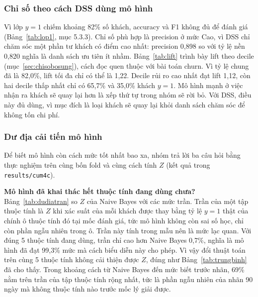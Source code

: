 \begin{table}[!htbp]
\centering
\caption{Giá trị ròng $Z$ của bốn cách chọn khách ở bốn mốc đánh giá}
\label{tab:zrecency}
\footnotesize
\resizebox{\textwidth}{!}{}
\end{table}

\subsubsection{Chỉ số theo cách DSS dùng mô hình}
Vì lớp $y=1$ chiếm khoảng 82\% số khách, accuracy và F1 không đủ để đánh giá (Bảng~\ref{tab:lop1}, mục 5.3.3). Chỉ số phù hợp là precision ở mức Cao, vì DSS chỉ chăm sóc một phần tư khách có điểm cao nhất: precision 0,898 so với tỷ lệ nền 0,820 nghĩa là danh sách ưu tiên ít nhầm. Bảng~\ref{tab:lift} trình bày lift theo decile (mục~\ref{sec:chisobosung}), cách đọc quen thuộc với bài toán churn. Vì tỷ lệ chung đã là 82,0\%, lift tối đa chỉ có thể là 1,22. Decile rủi ro cao nhất đạt lift 1,12, còn hai decile thấp nhất chỉ có 65,7\% và 35,0\% khách $y=1$. Mô hình mạnh ở việc nhận ra khách sẽ quay lại hơn là xếp thứ tự trong nhóm sẽ rời bỏ. Với DSS, điều này đủ dùng, vì mục đích là loại khách sẽ quay lại khỏi danh sách chăm sóc để không tốn chi phí.

\begin{table}[!htbp]
\centering
\caption{Lift theo decile của Naive Bayes tại mốc 01/03/2014 (tỷ lệ $y=1$ chung 82,0\%)}
\label{tab:lift}
\footnotesize

\end{table}

\subsubsection{Dư địa cải tiến mô hình}\label{sec:dudia}
Để biết mô hình còn cách mức tốt nhất bao xa, nhóm trả lời ba câu hỏi bằng thực nghiệm trên cùng bốn fold và cùng cách tính $Z$ (kết quả trong \texttt{results/cum4c}).

\textbf{Mô hình đã khai thác hết thuộc tính đang dùng chưa?} Bảng~\ref{tab:dudiatran} so $Z$ của Naive Bayes với các mức trần. Trần của một tập thuộc tính là $Z$ khi xác suất của mỗi khách được thay bằng tỷ lệ $y=1$ thật của chính ô thuộc tính đó tại mốc đánh giá, tức mô hình không còn sai số học, chỉ còn phần ngẫu nhiên trong ô. Trần này tính trong mẫu nên là mức lạc quan. Với đúng 5 thuộc tính đang dùng, trần chỉ cao hơn Naive Bayes 0,7\%, nghĩa là mô hình đã đạt 99,3\% mức mà cách biểu diễn này cho phép. Vì vậy đổi thuật toán trên cùng 5 thuộc tính không cải thiện được $Z$, đúng như Bảng~\ref{tab:trungbinh} đã cho thấy. Trong khoảng cách từ Naive Bayes đến mức biết trước nhãn, 69\% nằm trên trần của tập thuộc tính rộng nhất, tức là phần ngẫu nhiên của nhãn 90 ngày mà không thuộc tính nào trước mốc lý giải được.

